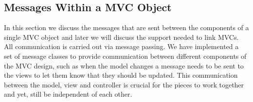 \documentclass[11pt]{article}
\newcommand{\Rfunction}[1]{{\textsf{#1}}}
\newcommand{\Rclass}[1]{\texttt{#1}}
\begin{document}
\subsection{Messages Within a MVC Object}
\label{Ssec:OneMess}

In this section we discuss the messages that are sent between the
components of a single MVC object and later we will discuss the
support needed to link MVCs.  All communication is carried out via
message passing. We have implemented a set of message classes to
provide communication between different components of the MVC design,
such as when the model changes a message needs to be sent to the views
to let them know that they should be updated.  This communication
between the model, view and controller is crucial for the pieces to
work together and yet, still be independent of each other.




\end{document}
